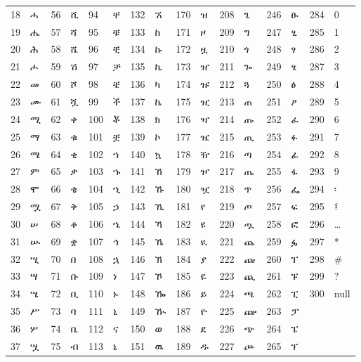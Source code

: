 \begin{table}[h!]
{\begin{tabular}{|ll|ll|ll|ll|ll|ll|ll|ll|}
			18 & ሓ & 56 & ሺ & 94  & ቸ & 132 & ኧ & 170 & ዝ & 208 & ጌ & 246 & ፁ & 284 & 0 \\
			19 & ሔ & 57 & ሻ & 95  & ቹ & 133 & ከ & 171 & ዞ & 209 & ግ & 247 & ፂ & 285 & 1 \\
			20 & ሕ & 58 & ሼ & 96  & ቺ & 134 & ኩ & 172 & ዟ & 210 & ጎ & 248 & ፃ & 286 & 2 \\
			21 & ሖ & 59 & ሽ & 97  & ቻ & 135 & ኪ & 173 & ዠ & 211 & ጐ & 249 & ፄ & 287 & 3 \\
			22 & መ & 60 & ሾ & 98  & ቼ & 136 & ካ & 174 & ዡ & 212 & ጓ & 250 & ፅ & 288 & 4 \\
			23 & ሙ & 61 & ሿ & 99  & ች & 137 & ኬ & 175 & ዢ & 213 & ጠ & 251 & ፆ & 289 & 5 \\
			24 & ሚ & 62 & ቀ & 100 & ቾ & 138 & ክ & 176 & ዣ & 214 & ጡ & 252 & ፈ & 290 & 6 \\
			25 & ማ & 63 & ቁ & 101 & ቿ & 139 & ኮ & 177 & ዤ & 215 & ጢ & 253 & ፉ & 291 & 7 \\
			26 & ሜ & 64 & ቂ & 102 & ኀ & 140 & ኳ & 178 & ዥ & 216 & ጣ & 254 & ፊ & 292 & 8 \\
			27 & ም & 65 & ቃ & 103 & ኁ & 141 & ኸ & 179 & ዦ & 217 & ጤ & 255 & ፋ & 293 & 9 \\
			28 & ሞ & 66 & ቄ & 104 & ኂ & 142 & ኹ & 180 & ዧ & 218 & ጥ & 256 & ፌ & 294 & ፡ \\
			29 & ሟ & 67 & ቅ & 105 & ኃ & 143 & ኺ & 181 & የ & 219 & ጦ & 257 & ፍ & 295 & ፤ \\
			30 & ሠ & 68 & ቆ & 106 & ኄ & 144 & ኻ & 182 & ዩ & 220 & ጧ & 258 & ፎ & 296 & … \\
			31 & ሡ & 69 & ቋ & 107 & ኅ & 145 & ኼ & 183 & ዪ & 221 & ጨ & 259 & ፏ & 297 & * \\
			32 & ሢ & 70 & በ & 108 & ኋ & 146 & ኽ & 184 & ያ & 222 & ጩ & 260 & ፐ & 298 & \# \\
			33 & ሣ & 71 & ቡ & 109 & ነ & 147 & ኾ & 185 & ዬ & 223 & ጪ & 261 & ፑ & 299 & ? \\
			34 & ሤ & 72 & ቢ & 110 & ኑ & 148 & ዀ & 186 & ይ & 224 & ጫ & 262 & ፒ & 300 & null \\ 
			\cline{15-16}
			35 & ሥ & 73 & ባ & 111 & ኒ & 149 & ዂ & 187 & ዮ & 225 & ጬ & 263 & ፓ &     & \multicolumn{1}{l}{}  \\
			36 & ሦ & 74 & ቤ & 112 & ና & 150 & ወ & 188 & ደ & 226 & ጭ & 264 & ፔ &     & \multicolumn{1}{l}{}  \\
			37 & ሧ & 75 & ብ & 113 & ኔ & 151 & ዉ & 189 & ዱ & 227 & ጮ & 265 & ፕ &     & \multicolumn{1}{l}{}  \\
			\cline{1-14}
	\end{tabular}}
	\label{tbl:encoding}
\end{table}

